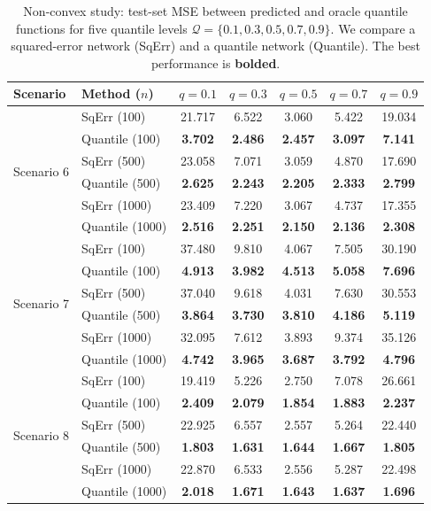 \documentclass[twoside,11pt]{article}
\begin{document}
\begin{table}[t]
\centering
\caption{Non-convex study: test-set MSE between predicted and oracle quantile functions for five quantile levels
$\mathcal{Q}=\{0.1,0.3,0.5,0.7,0.9\}$.
We compare a squared-error network (SqErr) and a quantile network (Quantile). The best performance is \textbf{bolded}.}
\label{tab:nn_nonconvex}
\small
\setlength{\tabcolsep}{5pt}
\renewcommand{\arraystretch}{1.15}
\begin{tabular}{llccccc}
\toprule
Scenario & Method ($n$) & $q=0.1$ & $q=0.3$ & $q=0.5$ & $q=0.7$ & $q=0.9$ \\
\midrule
\multirow{6}{*}{Scenario 6}
& SqErr (100)  & 21.717 & 6.522 & 3.060 & 5.422 & 19.034 \\
& Quantile (100) & \textbf{3.702} & \textbf{2.486} & \textbf{2.457} & \textbf{3.097} & \textbf{7.141} \\
& SqErr (500)  & 23.058 & 7.071 & 3.059 & 4.870 & 17.690 \\
& Quantile (500) & \textbf{2.625} & \textbf{2.243} & \textbf{2.205} & \textbf{2.333} & \textbf{2.799} \\
& SqErr (1000) & 23.409 & 7.220 & 3.067 & 4.737 & 17.355 \\
& Quantile (1000) & \textbf{2.516} & \textbf{2.251} & \textbf{2.150} & \textbf{2.136} & \textbf{2.308} \\
\midrule
\multirow{6}{*}{Scenario 7}
& SqErr (100)  & 37.480 & 9.810 & 4.067 & 7.505 & 30.190 \\
& Quantile (100) & \textbf{4.913} & \textbf{3.982} & \textbf{4.513} & \textbf{5.058} & \textbf{7.696} \\
& SqErr (500)  & 37.040 & 9.618 & 4.031 & 7.630 & 30.553 \\
& Quantile (500) & \textbf{3.864} & \textbf{3.730} & \textbf{3.810} & \textbf{4.186} & \textbf{5.119} \\
& SqErr (1000) & 32.095 & 7.612 & 3.893 & 9.374 & 35.126 \\
& Quantile (1000) & \textbf{4.742} & \textbf{3.965} & \textbf{3.687} & \textbf{3.792} & \textbf{4.796} \\
\midrule
\multirow{6}{*}{Scenario 8}
& SqErr (100)  & 19.419 & 5.226 & 2.750 & 7.078 & 26.661 \\
& Quantile (100) & \textbf{2.409} & \textbf{2.079} & \textbf{1.854} & \textbf{1.883} & \textbf{2.237} \\
& SqErr (500)  & 22.925 & 6.557 & 2.557 & 5.264 & 22.440 \\
& Quantile (500) & \textbf{1.803} & \textbf{1.631} & \textbf{1.644} & \textbf{1.667} & \textbf{1.805} \\
& SqErr (1000) & 22.870 & 6.533 & 2.556 & 5.287 & 22.498 \\
& Quantile (1000) & \textbf{2.018} & \textbf{1.671} & \textbf{1.643} & \textbf{1.637} & \textbf{1.696} \\
\bottomrule
\end{tabular}
\end{table}
\end{document}

